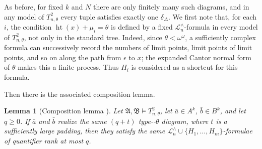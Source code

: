 \documentclass{amsart}
\newtheorem{lemma}{Lemma}
\theoremstyle{definition}
\begin{document}
As before, for fixed $k$ and $N$ there are only finitely many such diagrams, and in any model of $T_{n,\theta}^2$ every tuple satisfies exactly one $\delta_\Delta$.
We first note that, for each $i$, the condition $\operatorname{ht}(x)+\mu_i=\theta$ is defined by a fixed $\mathcal L_n^\wedge$-formula in every model of $T_{n,\theta}^2$, not only in the standard tree. Indeed, since $\theta<\omega^\omega$, a sufficiently complex formula can successively record the numbers of limit points, limit points of limit points, and so on along the path from $\epsilon$ to $x$; the expanded Cantor normal form of $\theta$ makes this a finite process. Thus $H_i$ is considered as a shortcut for this formula.

Then there is the associated composition lemma.
\begin{lemma}[Composition lemma \MakeUppercase{}]\label{lem:composition2}
    Let $\mathfrak A,\mathfrak B\models T_{n,\theta}^2$, let $\bar a\in A^k$, $\bar b\in B^k$, and let $q\ge 0$. If $\bar a$ and $\bar b$ realize the same $(q+t)$ type-\MakeUppercase{}-$\theta$ diagram, where $t$ is a sufficiently large padding, then they satisfy the same $\mathcal L_n^\wedge\cup\{H_1,\dots,H_m\}$-formulae of quantifier rank at most $q$.
\end{lemma}
\end{document}
